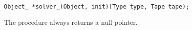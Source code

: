 
\tt{Object_ *solver_(Object, init)(Type type, Tape tape);}


The procedure always returns a null pointer.
